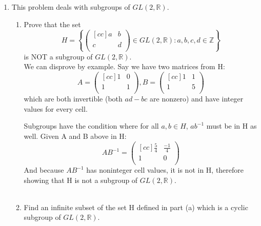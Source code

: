 
\usepackage{amsmath, dsfont}

\newenvironment{amatrix}[1]{%
  \left(\begin{array}{@{}*{#1}{c}|c@{}}
}{%
  \end{array}\right)
}

\makeatletter
\renewcommand*\env@matrix[1][*\c@MaxMatrixCols c]{%
  \hskip -\arraycolsep
  \let\@ifnextchar\new@ifnextchar
  \array{#1}}
\makeatother



\pagestyle{myheadings}


\begin{enumerate}
\item
This problem deals with subgroups of $GL(2,\mathds{R})$.
\begin{enumerate}
\item Prove that the set 
$$
  H = 
  \left \{
      \begin{pmatrix}[cc]
        a & b \\
        c & d \\
      \end{pmatrix}
      \in GL(2,\mathds{R}) : a,b,c,d \in \mathds{Z}
  \right \}
$$
is NOT a subgroup of $GL(2,\mathds{R})$.\\

We can disprove by example. Say we have two matrices from H:
$$
A =   \begin{pmatrix}[cc]
        1 & 0 \\
        1 & 1 \\
      \end{pmatrix},
B =   \begin{pmatrix}[cc]
        1 & 1 \\
        1 & 5 \\
      \end{pmatrix}
$$
which are both invertible (both $ad-bc$ are nonzero) and have integer values for every cell.

Subgroups have the condition where for all $a,b \in H$, $ab^{-1}$ must be in H as well. Given A and B above in H:
$$
AB^{-1} = \begin{pmatrix}[cc]
            \frac{5}{4} & \frac{-1}{4} \\
            1 & 0 \\
          \end{pmatrix}
$$
And because $AB^{-1}$ has noninteger cell values, it is not in H, therefore showing that H is not a subgroup of $GL(2,\mathds{R})$.\\\\
\item
  Find an infinite subset of the set H defined in part (a) which is a cyclic subgroup of $GL(2,\mathds{R})$.\\


\end{enumerate}
\end{enumerate}
